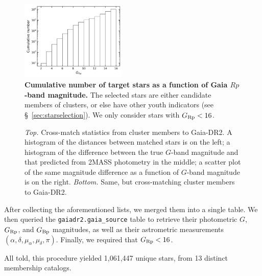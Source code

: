 \documentclass[12pt,twocolumn,tighten]{aastex62}
\begin{document}
\begin{figure}[t]
	\begin{center}
		\leavevmode
		\includegraphics[width=0.45\textwidth]{target_star_cumulative_counts.png}
	\end{center}
	\vspace{-0.2cm}
	\caption{
    {\bf Cumulative number of target stars as
    a function of Gaia $Rp$-band magnitude.}  The selected stars are
    either candidate members of clusters, or else have other youth
    indicators (see \S~\ref{sec:starselection}). We only consider
    stars with $G_{\rm Rp} < 16$.
	\label{fig:cdips_targets}
	}
\end{figure}

\begin{figure}[!ht]
	\vspace{-0.8cm}
	\caption{
    {\it Top.} Cross-match statistics from
    \cite{Kharchenko_et_al_2013} cluster members to Gaia-DR2. A
    histogram of the distances between matched stars is on the left; a
    histogram of the difference between the true $G$-band magnitude
    and that predicted from 2MASS photometry in the middle; a scatter
    plot of the same magnitude difference as a function of $G$-band
    magnitude is on the right.
    {\it Bottom.} Same, but cross-matching \cite{dias_proper_2014}
    cluster members to Gaia-DR2.
	}
	\label{fig:xmatch_info}
\end{figure}


After collecting the aforementioned lists, we
merged them into a single table. We then queried the
\texttt{gaiadr2.gaia\_source} table to retrieve their photometric $G$,
$G_{\rm Rp}$, and $G_{\rm Bp}$ magnitudes, as well as their
astrometric measurements $(\alpha, \delta, \mu_\alpha, \mu_\delta,
\pi)$.  Finally, we required that $G_{\rm Rp} < 16$.  

All told, this procedure yielded 1{,}061{,}447 unique stars, from 13 distinct
membership catalogs.
\end{document}
